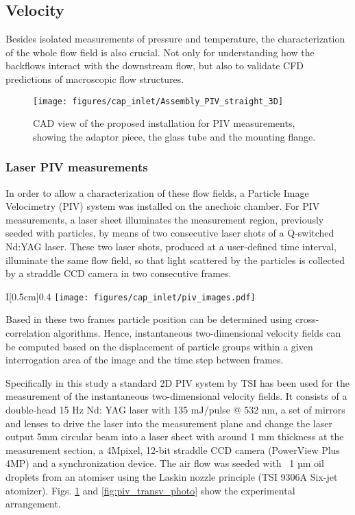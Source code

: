\subsection{Velocity}

Besides isolated measurements of pressure and temperature, the characterization of the whole flow field is also crucial. Not only for understanding how the backflows interact with the downstream flow, but also to validate CFD predictions of macroscopic flow structures.

\begin{figure}[htb!]
\centering
\texttt{[image: figures/cap\_inlet/Assembly\_PIV\_straight\_3D]}
\caption{CAD view of the proposed installation for PIV measurements, showing the adaptor piece, the glass tube and the mounting flange.}
\label{fig:assembly_piv}
\end{figure}

\subsubsection{Laser PIV measurements}\label{sub:setup_piv}

In order to allow a characterization of these flow fields, a Particle Image Velocimetry (PIV) system was installed on the anechoic chamber. For PIV measurements, a laser sheet illuminates the measurement region, previously seeded with particles, by means of two consecutive laser shots of a Q-switched Nd:YAG laser. These two laser shots, produced at a user-defined time interval, illuminate the same flow field, so that light scattered by the particles is collected by a straddle CCD camera in two consecutive frames.

\begin{wrapfigure}{I}[0.5cm]{0.4\textwidth}
\centering
\null\vspace{0mm}
\texttt{[image: figures/cap\_inlet/piv\_images.pdf]}
\caption{Images of the laser sheet illuminating the glass duct in the transversal PIV setup.}
\label{fig:piv_transv_photo}
\end{wrapfigure}

Based in these two frames particle position can be determined using cross-correlation algorithms. Hence, instantaneous two-dimensional velocity fields can be computed based on the displacement of particle groups within a given interrogation area of the image and the time step between frames.

Specifically in this study a standard 2D PIV system by TSI has been used for the measurement of the instantaneous two-dimensional velocity fields. It consists of a double-head 15 Hz Nd: YAG laser with 135 mJ/pulse @ 532 nm, a set of mirrors and lenses to drive the laser into the measurement plane and change the laser output 5mm circular beam into a laser sheet with around 1 mm thickness at the measurement section, a 4Mpixel, 12-bit straddle CCD camera (PowerView Plus 4MP) and a synchronization device.
The air flow was seeded with ~1 µm oil droplets from an atomiser using the Laskin nozzle principle (TSI 9306A Six-jet atomizer). Figs. \ref{fig:assembly_piv} and \ref{fig:piv_transv_photo} show the experimental arrangement.

